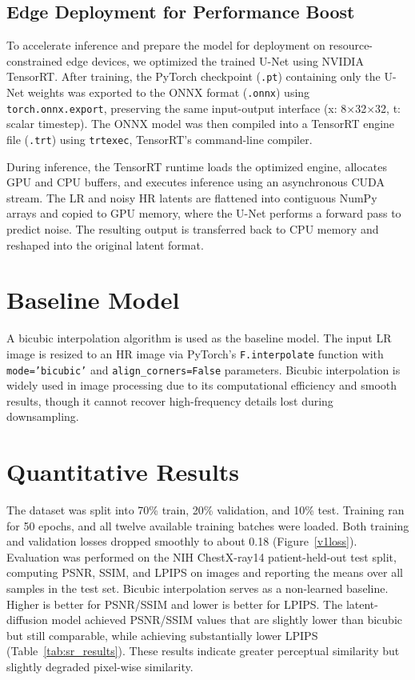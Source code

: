\documentclass{article} %
\begin{document}
\subsection{Edge Deployment for Performance Boost}

To accelerate inference and prepare the model for deployment on resource-constrained edge devices, we optimized the trained U-Net using NVIDIA TensorRT. After training, the PyTorch checkpoint (\texttt{.pt}) containing only the U-Net weights was exported to the ONNX format (\texttt{.onnx}) using \texttt{torch.onnx.export}, preserving the same input-output interface (x: 8×32×32, t: scalar timestep). The ONNX model was then compiled into a TensorRT engine file (\texttt{.trt}) using \texttt{trtexec}, TensorRT’s command-line compiler.

During inference, the TensorRT runtime loads the optimized engine, allocates GPU and CPU buffers, and executes inference using an asynchronous CUDA stream. The LR and noisy HR latents are flattened into contiguous NumPy arrays and copied to GPU memory, where the U-Net performs a forward pass to predict noise. The resulting output is transferred back to CPU memory and reshaped into the original latent format.


\section{Baseline Model}

A bicubic interpolation algorithm \citep{keys1981cubic} is used as the baseline model. The input LR image is resized to an HR image via PyTorch's \texttt{F.interpolate} function with \texttt{mode='bicubic'} and \texttt{align\_corners=False} parameters. Bicubic interpolation is widely used in image processing due to its computational efficiency and smooth results, though it cannot recover high-frequency details lost during downsampling.

\section{Quantitative Results}

The dataset was split into 70\% train, 20\% validation, and 10\% test. Training ran for 50 epochs, and all twelve available training batches were loaded. Both training and validation losses dropped smoothly to about 0.18 (Figure~\ref{v1loss}). Evaluation was performed on the NIH ChestX-ray14 patient-held-out test split, computing PSNR, SSIM, and LPIPS on images and reporting the means over all samples in the test set. Bicubic interpolation serves as a non-learned baseline. Higher is better for PSNR/SSIM and lower is better for LPIPS. The latent-diffusion model achieved PSNR/SSIM values that are slightly lower than bicubic but still comparable, while achieving substantially lower LPIPS (Table~\ref{tab:sr_results}). These results indicate greater perceptual similarity but slightly degraded pixel-wise similarity.
\end{document}

